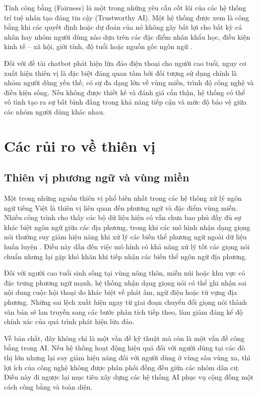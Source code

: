 Tính công bằng (Fairness) là một trong những yêu cầu cốt lõi của các hệ thống trí tuệ nhân tạo đáng tin cậy (Trustworthy AI). Một hệ thống được xem là công bằng khi các quyết định hoặc dự đoán của nó không gây bất lợi cho bất kỳ cá nhân hay nhóm người dùng nào dựa trên các đặc điểm nhân khẩu học, điều kiện kinh tế – xã hội, giới tính, độ tuổi hoặc nguồn gốc ngôn ngữ \cite{ferrara2023_bias_ai}.

Đối với đề tài chatbot phát hiện lừa đảo điện thoại cho người cao tuổi, nguy cơ xuất hiện thiên vị là đặc biệt đáng quan tâm bởi đối tượng sử dụng chính là nhóm người dùng yếu thế, có sự đa dạng lớn về vùng miền, trình độ công nghệ và điều kiện sống. Nếu không được thiết kế và đánh giá cẩn thận, hệ thống có thể vô tình tạo ra sự bất bình đẳng trong khả năng tiếp cận và mức độ bảo vệ giữa các nhóm người dùng khác nhau.

\section{Các rủi ro về thiên vị}
\subsection{Thiên vị phương ngữ và vùng miền}
Một trong những nguồn thiên vị phổ biến nhất trong các hệ thống xử lý ngôn ngữ tiếng Việt là thiên vị liên quan đến phương ngữ và đặc điểm vùng miền. Nhiều công trình cho thấy các bộ dữ liệu hiện có vẫn chưa bao phủ đầy đủ sự khác biệt ngôn ngữ giữa các địa phương, trong khi các mô hình nhận dạng giọng nói thường suy giảm hiệu năng khi xử lý các biến thể phương ngữ ngoài dữ liệu huấn luyện \cite{nguyen2024_vimd}. Điều này dẫn đến việc mô hình có khả năng xử lý tốt các giọng nói chuẩn nhưng lại gặp khó khăn khi tiếp nhận các biến thể ngôn ngữ địa phương.

Đối với người cao tuổi sinh sống tại vùng nông thôn, miền núi hoặc khu vực có đặc trưng phương ngữ mạnh, hệ thống nhận dạng giọng nói có thể ghi nhận sai nội dung cuộc hội thoại do khác biệt về phát âm, ngữ điệu hoặc từ vựng địa phương. Những sai lệch xuất hiện ngay từ giai đoạn chuyển đổi giọng nói thành văn bản sẽ lan truyền sang các bước phân tích tiếp theo, làm giảm đáng kể độ chính xác của quá trình phát hiện lừa đảo.

Về bản chất, đây không chỉ là một vấn đề kỹ thuật mà còn là một vấn đề công bằng trong AI. Nếu hệ thống hoạt động hiệu quả đối với người dùng tại các đô thị lớn nhưng lại suy giảm hiệu năng đối với người dùng ở vùng sâu vùng xa, thì lợi ích của công nghệ không được phân phối đồng đều giữa các nhóm dân cư. Điều này đi ngược lại mục tiêu xây dựng các hệ thống AI phục vụ cộng đồng một cách công bằng và toàn diện.

